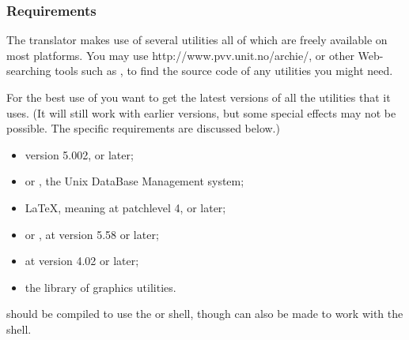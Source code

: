 \htmlrule
\tableofchildlinks

\subsubsection{Requirements}%
\html{\\}%
The translator makes use of several utilities all of which
are freely available on most platforms.
You may use \htmladdnormallinkfoot{\html{ }}%
{http://www.pvv.unit.no/archie/},
or other Web-searching tools such as %
,
to find the source code of any utilities you might need.

\medskip\noindent
For the best use of \latextohtml{} you want to get the latest
versions of all the utilities that it uses. (It will still work
with earlier versions, but some  special effects may not be possible.
The specific requirements are discussed below.)
%
\begin{itemize}
\item \Perl{} version 5.002, or later;
\item {} or , the Unix DataBase Management system;
\item \LaTeX, meaning \LaTeXe{} at patchlevel 4, or later;
\item {} or , at version 5.58 or later;
\item {} at version 4.02 or later;
\item the  library of graphics utilities.
\end{itemize}
\Perl{} should be compiled to use the  or  shell,
though \latextohtml{} can also be made to work with the  shell.

